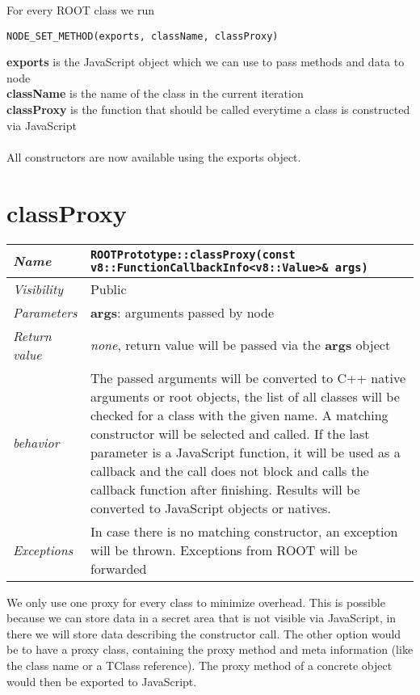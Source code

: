 For every ROOT class we run
\begin{verbatim}
NODE_SET_METHOD(exports, className, classProxy)
\end{verbatim}

\textbf{exports} is the JavaScript object which we can use to pass methods and data to node \\
\textbf{className} is the name of the class in the current iteration\\
\textbf{classProxy} is the function that should be called everytime a class is constructed via JavaScript\\
\\
All constructors are now available using the exports object.
\newpage
\section{classProxy}
\begin{longtable}{p{3cm} @{\hskip 1cm} p{12cm}}
  \hline
  \textit{Name} & \texttt{ROOTPrototype::classProxy(const v8::FunctionCallbackInfo<v8::Value>\& args)} \\
  \hline
  \textit{Visibility} & Public \\
  \hline
  \textit{Parameters} & \textbf{args}: arguments passed by node \\
  \hline
  \textit{Return value} & \textit{none}, return value will be passed via the \textbf{args} object \\
  \hline
  \textit{behavior} & The passed arguments will be converted to C++ native arguments or root objects, the list of all classes will be checked for a class with the given name. A matching constructor will be selected and called.
  If the last parameter is a JavaScript function, it will be used as a callback and the call does not block and calls the callback function after finishing.
  Results will be converted to JavaScript objects or natives. \\
  \hline
  \textit{Exceptions} & In case there is no matching constructor, an exception will be thrown.
  Exceptions from ROOT will be forwarded
  \hline
\end{longtable}
We only use one proxy for every class to minimize overhead. This is possible because we can store data in a secret area that is not visible via JavaScript, in there we will store data describing the constructor call.
The other option would be to have a proxy class, containing the proxy method and meta information (like the class name or a TClass reference).
The proxy method of a concrete object would then be exported to JavaScript.

